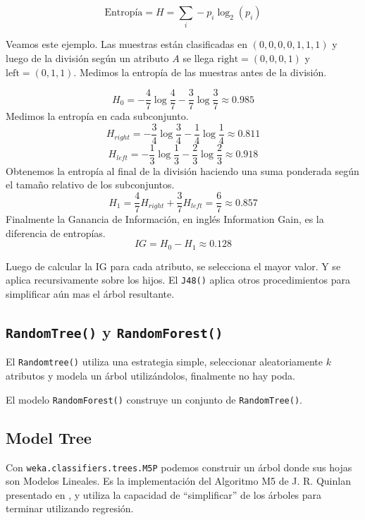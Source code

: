 \documentclass[10pt,a4paper]{article}
\begin{document}
\[
\text{Entropía} = H = \sum_i -p_i \log_2(p_i)
\]

Veamos este ejemplo. Las muestras están clasificadas en $(0, 0, 0, 0, 1, 1, 1)$ y luego de la división según un atributo $A$ se llega $\text{right}=(0, 0, 0, 1)$ y $\text{left}=(0, 1, 1)$. Medimos la entropía de las muestras antes de la división.

\[
H_0 = -\frac{4}{7} \log\frac{4}{7} -\frac{3}{7} \log\frac{3}{7} \approx 0.985
\]
Medimos la entropía en cada subconjunto.
\[
H_{right} = -\frac{3}{4} \log\frac{3}{4} - \frac{1}{4} \log\frac{1}{4} \approx 0.811
\]
\[
H_{left} = -\frac{1}{3} \log\frac{1}{3} - \frac{2}{3} \log\frac{2}{3} \approx 0.918
\]
Obtenemos la entropía al final de la división haciendo una suma ponderada según el tamaño relativo de los subconjuntos.
\[
H_1 = \frac{4}{7}H_{right} + \frac{3}{7}H_{left} = \frac{6}{7} \approx 0.857
\]
Finalmente la Ganancia de Información, en inglés Information Gain, es la diferencia de entropías.
\[
IG = H_0 - H_1 \approx 0.128
\]

Luego de calcular la IG para cada atributo, se selecciona el mayor valor. Y se aplica recursivamente sobre los hijos. El \lstinline{J48()} aplica otros procedimientos para simplificar aún mas el árbol resultante.

\subsection{\texorpdfstring{\lstinline{RandomTree()}}{RandomTree()} y \texorpdfstring{\lstinline{RandomForest()}}{RandomForest()}} %
El \lstinline{Randomtree()} utiliza una estrategia simple, seleccionar aleatoriamente $k$ atributos y modela un árbol utilizándolos, finalmente no hay poda.

El modelo \lstinline{RandomForest()} construye un conjunto de \lstinline{RandomTree()}.


\subsection{Model Tree} \label{m5p}
Con \lstinline{weka.classifiers.trees.M5P} podemos construir un árbol donde sus hojas son Modelos Lineales. Es la implementación del Algoritmo M5 de J. R. Quinlan presentado en \cite{quinlan1992learning}, y utiliza la capacidad de ``simplificar'' de los árboles para terminar utilizando regresión.

\end{document}
